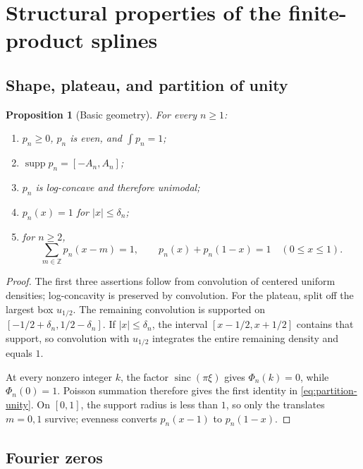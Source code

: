 \documentclass[11pt]{article}
\newtheorem{proposition}[theorem]{Proposition}
\theoremstyle{definition}
\theoremstyle{remark}
\newcommand{\supp}{\operatorname{supp}}
\newcommand{\sinc}{\operatorname{sinc}}
\begin{document}
\section{Structural properties of the finite-product splines}
\label{sec:properties}

\subsection{Shape, plateau, and partition of unity}

\begin{proposition}[Basic geometry]
\label{prop:basic-geometry}
For every $n\ge1$:
\begin{enumerate}[label=(\roman*),leftmargin=2.1em]
\item $p_n\ge0$, $p_n$ is even, and $\int p_n=1$;
\item $\supp p_n=[-A_n,A_n]$;
\item $p_n$ is log-concave and therefore unimodal;
\item $p_n(x)=1$ for $|x|\le\delta_n$;
\item for $n\ge2$,
\begin{equation}
 \sum_{m\in\mathbb Z}p_n(x-m)=1,
 \qquad
 p_n(x)+p_n(1-x)=1\quad(0\le x\le1).
 \label{eq:partition-unity}
\end{equation}
\end{enumerate}
\end{proposition}

\begin{proof}
The first three assertions follow from convolution of centered uniform densities;
log-concavity is preserved by convolution.  For the plateau, split off the largest box
$u_{1/2}$.  The remaining convolution is supported on
$[-1/2+\delta_n,1/2-\delta_n]$.  If $|x|\le\delta_n$, the interval
$[x-1/2,x+1/2]$ contains that support, so convolution with $u_{1/2}$ integrates the
entire remaining density and equals $1$.

At every nonzero integer $k$, the factor $\sinc(\pi\xi)$ gives $\Phi_n(k)=0$, while
$\Phi_n(0)=1$.  Poisson summation therefore gives the first identity in
\cref{eq:partition-unity}.  On $[0,1]$, the support radius is less than $1$, so only the
translates $m=0,1$ survive; evenness converts $p_n(x-1)$ to $p_n(1-x)$.
\end{proof}

\subsection{Fourier zeros}
\end{document}
